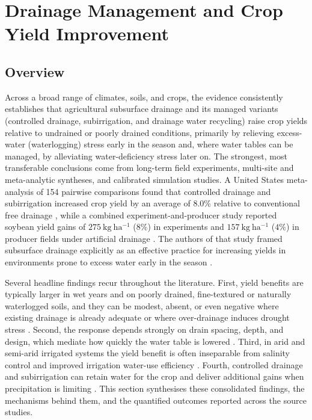 \documentclass[11pt]{article}
\begin{document}
\section*{Drainage Management and Crop Yield Improvement}

\subsection{Overview}

Across a broad range of climates, soils, and crops, the evidence consistently establishes that agricultural subsurface drainage and its managed variants (controlled drainage, subirrigation, and drainage water recycling) raise crop yields relative to undrained or poorly drained conditions, primarily by relieving excess-water (waterlogging) stress early in the season and, where water tables can be managed, by alleviating water-deficiency stress later on. The strongest, most transferable conclusions come from long-term field experiments, multi-site and meta-analytic syntheses, and calibrated simulation studies. A United States meta-analysis of 154 pairwise comparisons found that controlled drainage and subirrigation increased crop yield by an average of \(8.0\%\) relative to conventional free drainage \parencite{Singh2022b}, while a combined experiment-and-producer study reported soybean yield gains of \(275\ \mathrm{kg\ ha^{-1}}\) (\(8\%\)) in experiments and \(157\ \mathrm{kg\ ha^{-1}}\) (\(4\%\)) in producer fields under artificial drainage \parencite{Mourtzinis2021}. The authors of that study framed subsurface drainage explicitly as an effective practice for increasing yields in environments prone to excess water early in the season \parencite{Mourtzinis2021}.

Several headline findings recur throughout the literature. First, yield benefits are typically larger in wet years and on poorly drained, fine-textured or naturally waterlogged soils, and they can be modest, absent, or even negative where existing drainage is already adequate or where over-drainage induces drought stress \parencite{JORJANI1991,Wiersma2010,Cordeiro2015,Kladivko2005}. Second, the response depends strongly on drain spacing, depth, and design, which mediate how quickly the water table is lowered \parencite{HARDJOAMIDJOJO1982,Skaggs2006,Rui2024,Acharya2019}. Third, in arid and semi-arid irrigated systems the yield benefit is often inseparable from salinity control and improved irrigation water-use efficiency \parencite{ELMOWELHI1988,Mathew2001,Yang2022,Liu2025}. Fourth, controlled drainage and subirrigation can retain water for the crop and deliver additional gains when precipitation is limiting \parencite{Kaur2021,Gunn2018,Gunn2019,Nelson2011}. This section synthesises these consolidated findings, the mechanisms behind them, and the quantified outcomes reported across the source studies.
\end{document}

